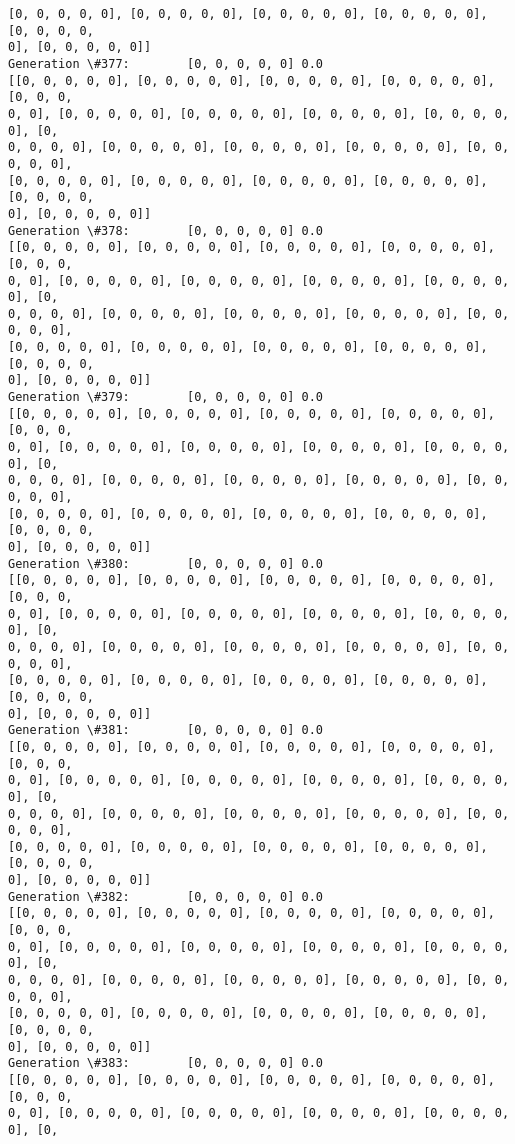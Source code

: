 \documentclass[11pt]{article}
\begin{document}
\begin{Verbatim}[commandchars=\\\{\}]
[0, 0, 0, 0, 0], [0, 0, 0, 0, 0], [0, 0, 0, 0, 0], [0, 0, 0, 0, 0], [0, 0, 0, 0,
0], [0, 0, 0, 0, 0]]
Generation \#377:        [0, 0, 0, 0, 0] 0.0
[[0, 0, 0, 0, 0], [0, 0, 0, 0, 0], [0, 0, 0, 0, 0], [0, 0, 0, 0, 0], [0, 0, 0,
0, 0], [0, 0, 0, 0, 0], [0, 0, 0, 0, 0], [0, 0, 0, 0, 0], [0, 0, 0, 0, 0], [0,
0, 0, 0, 0], [0, 0, 0, 0, 0], [0, 0, 0, 0, 0], [0, 0, 0, 0, 0], [0, 0, 0, 0, 0],
[0, 0, 0, 0, 0], [0, 0, 0, 0, 0], [0, 0, 0, 0, 0], [0, 0, 0, 0, 0], [0, 0, 0, 0,
0], [0, 0, 0, 0, 0]]
Generation \#378:        [0, 0, 0, 0, 0] 0.0
[[0, 0, 0, 0, 0], [0, 0, 0, 0, 0], [0, 0, 0, 0, 0], [0, 0, 0, 0, 0], [0, 0, 0,
0, 0], [0, 0, 0, 0, 0], [0, 0, 0, 0, 0], [0, 0, 0, 0, 0], [0, 0, 0, 0, 0], [0,
0, 0, 0, 0], [0, 0, 0, 0, 0], [0, 0, 0, 0, 0], [0, 0, 0, 0, 0], [0, 0, 0, 0, 0],
[0, 0, 0, 0, 0], [0, 0, 0, 0, 0], [0, 0, 0, 0, 0], [0, 0, 0, 0, 0], [0, 0, 0, 0,
0], [0, 0, 0, 0, 0]]
Generation \#379:        [0, 0, 0, 0, 0] 0.0
[[0, 0, 0, 0, 0], [0, 0, 0, 0, 0], [0, 0, 0, 0, 0], [0, 0, 0, 0, 0], [0, 0, 0,
0, 0], [0, 0, 0, 0, 0], [0, 0, 0, 0, 0], [0, 0, 0, 0, 0], [0, 0, 0, 0, 0], [0,
0, 0, 0, 0], [0, 0, 0, 0, 0], [0, 0, 0, 0, 0], [0, 0, 0, 0, 0], [0, 0, 0, 0, 0],
[0, 0, 0, 0, 0], [0, 0, 0, 0, 0], [0, 0, 0, 0, 0], [0, 0, 0, 0, 0], [0, 0, 0, 0,
0], [0, 0, 0, 0, 0]]
Generation \#380:        [0, 0, 0, 0, 0] 0.0
[[0, 0, 0, 0, 0], [0, 0, 0, 0, 0], [0, 0, 0, 0, 0], [0, 0, 0, 0, 0], [0, 0, 0,
0, 0], [0, 0, 0, 0, 0], [0, 0, 0, 0, 0], [0, 0, 0, 0, 0], [0, 0, 0, 0, 0], [0,
0, 0, 0, 0], [0, 0, 0, 0, 0], [0, 0, 0, 0, 0], [0, 0, 0, 0, 0], [0, 0, 0, 0, 0],
[0, 0, 0, 0, 0], [0, 0, 0, 0, 0], [0, 0, 0, 0, 0], [0, 0, 0, 0, 0], [0, 0, 0, 0,
0], [0, 0, 0, 0, 0]]
Generation \#381:        [0, 0, 0, 0, 0] 0.0
[[0, 0, 0, 0, 0], [0, 0, 0, 0, 0], [0, 0, 0, 0, 0], [0, 0, 0, 0, 0], [0, 0, 0,
0, 0], [0, 0, 0, 0, 0], [0, 0, 0, 0, 0], [0, 0, 0, 0, 0], [0, 0, 0, 0, 0], [0,
0, 0, 0, 0], [0, 0, 0, 0, 0], [0, 0, 0, 0, 0], [0, 0, 0, 0, 0], [0, 0, 0, 0, 0],
[0, 0, 0, 0, 0], [0, 0, 0, 0, 0], [0, 0, 0, 0, 0], [0, 0, 0, 0, 0], [0, 0, 0, 0,
0], [0, 0, 0, 0, 0]]
Generation \#382:        [0, 0, 0, 0, 0] 0.0
[[0, 0, 0, 0, 0], [0, 0, 0, 0, 0], [0, 0, 0, 0, 0], [0, 0, 0, 0, 0], [0, 0, 0,
0, 0], [0, 0, 0, 0, 0], [0, 0, 0, 0, 0], [0, 0, 0, 0, 0], [0, 0, 0, 0, 0], [0,
0, 0, 0, 0], [0, 0, 0, 0, 0], [0, 0, 0, 0, 0], [0, 0, 0, 0, 0], [0, 0, 0, 0, 0],
[0, 0, 0, 0, 0], [0, 0, 0, 0, 0], [0, 0, 0, 0, 0], [0, 0, 0, 0, 0], [0, 0, 0, 0,
0], [0, 0, 0, 0, 0]]
Generation \#383:        [0, 0, 0, 0, 0] 0.0
[[0, 0, 0, 0, 0], [0, 0, 0, 0, 0], [0, 0, 0, 0, 0], [0, 0, 0, 0, 0], [0, 0, 0,
0, 0], [0, 0, 0, 0, 0], [0, 0, 0, 0, 0], [0, 0, 0, 0, 0], [0, 0, 0, 0, 0], [0,

\end{Verbatim}
\end{document}
